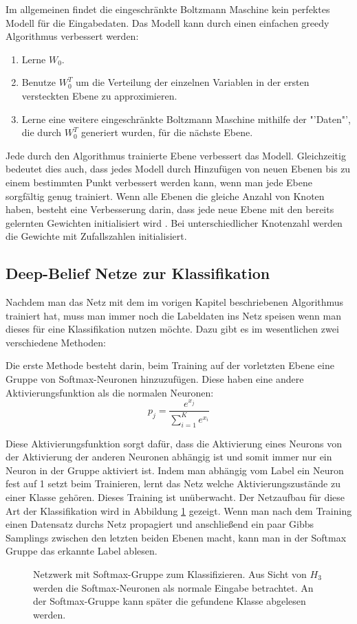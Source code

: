\documentclass[12pt]{article}
\begin{document}
Im allgemeinen findet die eingeschränkte Boltzmann Maschine kein perfektes Modell für die Eingabedaten. Das Modell kann durch einen einfachen greedy Algorithmus verbessert werden:
 
\begin{enumerate}
\item Lerne $W_0$.
\item Benutze $W_0^T$ um die Verteilung der einzelnen Variablen in der ersten versteckten Ebene zu approximieren.
\item Lerne eine weitere eingeschränkte Boltzmann Maschine  mithilfe der "'Daten"', die durch $W_0^T$ generiert wurden, für die nächste Ebene.
\end{enumerate}



Jede durch den Algorithmus trainierte Ebene verbessert das Modell. Gleichzeitig bedeutet dies auch, dass jedes Modell durch Hinzufügen von neuen Ebenen bis zu einem bestimmten Punkt verbessert werden kann, wenn man jede Ebene sorgfältig genug trainiert. Wenn alle Ebenen die gleiche Anzahl von Knoten haben, besteht eine Verbesserung darin, dass jede neue Ebene mit den bereits gelernten Gewichten initialisiert wird \cite{learning}. Bei unterschiedlicher Knotenzahl werden die Gewichte mit Zufallszahlen initialisiert.

\subsection{Deep-Belief Netze zur Klassifikation}
Nachdem man das Netz mit dem im vorigen Kapitel beschriebenen Algorithmus trainiert hat, muss man immer noch die Labeldaten ins Netz speisen wenn man dieses für eine Klassifikation nutzen möchte. Dazu gibt es im wesentlichen zwei verschiedene Methoden:

Die erste Methode besteht darin, beim Training auf der vorletzten Ebene eine Gruppe von Softmax-Neuronen hinzuzufügen. Diese haben eine andere Aktivierungsfunktion als die normalen Neuronen: 
\begin{equation}
p_j = \frac{e^{x_j}}{\sum_{i=1}^K e^{x_i}}
\end{equation}

Diese Aktivierungsfunktion sorgt dafür, dass die Aktivierung eines Neurons von der Aktivierung der anderen Neuronen abhängig ist und somit immer nur ein Neuron in der Gruppe aktiviert ist. Indem man abhängig vom Label ein Neuron fest auf 1 setzt beim Trainieren, lernt das Netz welche Aktivierungszustände zu einer Klasse gehören. Dieses Training ist unüberwacht. Der Netzaufbau für diese Art der Klassifikation wird in Abbildung \ref{SMTrain} gezeigt. Wenn man nach dem Training einen Datensatz durchs Netz propagiert und anschließend ein paar Gibbs Samplings zwischen den letzten beiden Ebenen macht, kann man in der Softmax Gruppe das erkannte Label ablesen.
\begin{figure}[H]
	\center
	
	\caption{Netzwerk mit Softmax-Gruppe zum Klassifizieren. Aus Sicht von $H_3$ werden die Softmax-Neuronen als normale Eingabe betrachtet. An der Softmax-Gruppe kann später die gefundene Klasse abgelesen werden.}
	\label{SMTrain}
\end{figure}
\end{document}
